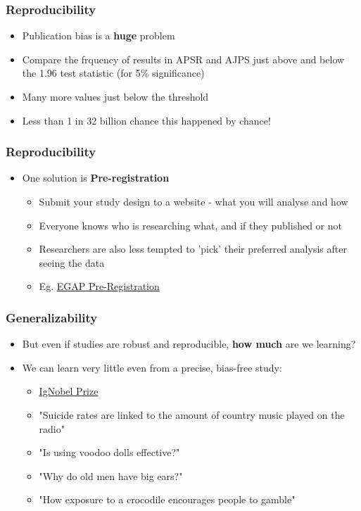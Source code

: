 \documentclass[xcolor=x11names,compress]{beamer}\usepackage[]{graphicx}\usepackage[]{color}
\renewcommand{\(}{\begin{columns}}
\renewcommand{\)}{\end{columns}}
\newcommand{\<}[1]{\begin{column}{#1}}
\renewcommand{\>}{\end{column}}
\begin{document}
\begin{frame}
\frametitle{Reproducibility}
\begin{itemize}
\item Publication bias is a \textbf{huge} problem
\pause
\item Compare the frquency of results in APSR and AJPS just above and below the 1.96 test statistic (for 5\% significance)
\pause
\item Many more values just below the threshold
\pause
\item Less than 1 in 32 billion chance this happened by chance!
\end{itemize}
\end{frame}




\begin{frame}
\frametitle{Reproducibility}
\begin{itemize}
\item One solution is \textbf{Pre-registration}
\pause
\begin{itemize}
\item Submit your study design to a website - what you will analyse and how
\pause
\item Everyone knows who is researching what, and if they published or not
\pause
\item Researchers are also less tempted to 'pick' their preferred analysis after seeing the data
\pause
\item Eg. \href{https://egap.org/content/registration}{EGAP Pre-Registration}
\end{itemize}
\end{itemize}
\end{frame}

\begin{frame}
\frametitle{Generalizability}
\begin{itemize}
\item But even if studies are robust and reproducible, \textbf{how much} are we learning?
\pause
\item We can learn very little even from a precise, bias-free study:
\pause
\begin{itemize}
\item \href{https://www.improbable.com/ig/winners}{IgNobel Prize}
\item "Suicide rates are linked to the amount of country music played on the radio"
\item "Is using voodoo dolls effective?"
\item "Why do old men have big ears?"
\item "How exposure to a crocodile encourages people to gamble"
\end{itemize}
\end{itemize}
\end{frame}
\end{document}
